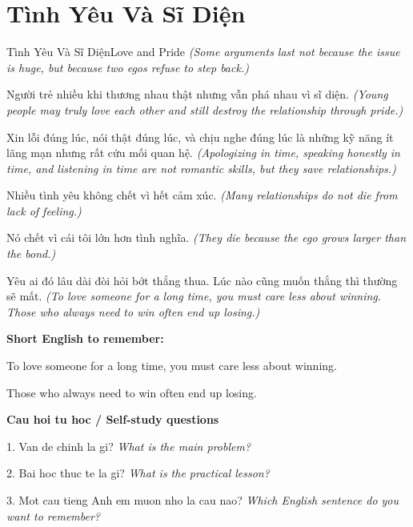 \section{Tình Yêu Và Sĩ Diện}
\begin{truyen}{Tình Yêu Và Sĩ Diện}{Love and Pride}
\textit{(Some arguments last not because the issue is huge, but because two egos refuse to step back.)}

Người trẻ nhiều khi thương nhau thật nhưng vẫn phá nhau vì sĩ diện.
\textit{(Young people may truly love each other and still destroy the relationship through pride.)}

Xin lỗi đúng lúc, nói thật đúng lúc, và chịu nghe đúng lúc là những kỹ năng ít lãng mạn nhưng rất cứu mối quan hệ.
\textit{(Apologizing in time, speaking honestly in time, and listening in time are not romantic skills, but they save relationships.)}

Nhiều tình yêu không chết vì hết cảm xúc.
\textit{(Many relationships do not die from lack of feeling.)}

Nó chết vì cái tôi lớn hơn tình nghĩa.
\textit{(They die because the ego grows larger than the bond.)}

\end{truyen}

\begin{baihoc}
Yêu ai đó lâu dài đòi hỏi bớt thắng thua. Lúc nào cũng muốn thắng thì thường sẽ mất.
\textit{(To love someone for a long time, you must care less about winning. Those who always need to win often end up losing.)}
\end{baihoc}

\begin{ghinhoanh}
\textbf{Short English to remember:}

To love someone for a long time, you must care less about winning.

Those who always need to win often end up losing.

\end{ghinhoanh}

\begin{tuhocnhanh}
\textbf{Cau hoi tu hoc / Self-study questions}

1. Van de chinh la gi? \textit{What is the main problem?}

2. Bai hoc thuc te la gi? \textit{What is the practical lesson?}

3. Mot cau tieng Anh em muon nho la cau nao? \textit{Which English sentence do you want to remember?}
\end{tuhocnhanh}
\ngancach

